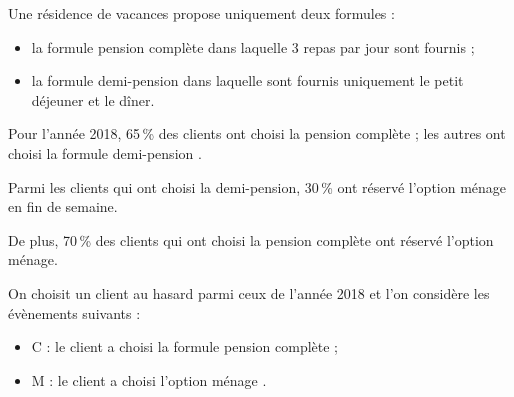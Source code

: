\medskip

Une résidence de vacances propose uniquement deux formules :

\begin{itemize}
\item la formule \og pension complète \fg{} dans laquelle 3 repas par jour sont fournis ;
\item la formule \og demi-pension \fg{} dans laquelle sont fournis uniquement le petit déjeuner et le dîner.
\end{itemize}
Pour l’année 2018, 65\,\% des clients ont choisi la pension complète ; les autres ont choisi la formule \og demi-pension \fg.

Parmi les clients qui ont choisi la demi-pension, 30\,\% ont réservé l’option \og ménage \fg{} en fin de semaine.

De plus, 70\,\% des clients qui ont choisi la pension complète ont réservé l’option \og ménage\fg.

On choisit un client au hasard parmi ceux de l’année 2018 et l’on considère les évènements suivants :

\begin{itemize}
\item C : le client a choisi la formule \og pension complète \fg{} ;
\item M : le client a choisi l’option \og ménage \fg.
\end{itemize}

\medskip


